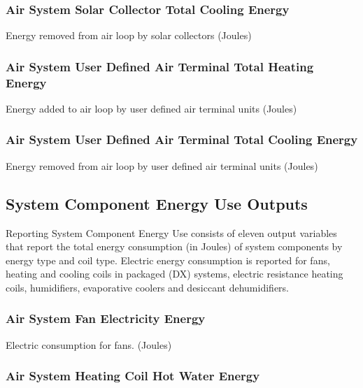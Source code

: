 \subsubsection{Air System Solar Collector Total Cooling Energy}\label{air-system-solar-collector-total-cooling-energy}

Energy removed from air loop by solar collectors (Joules)

\subsubsection{Air System User Defined Air Terminal Total Heating Energy}\label{air-system-user-defined-air-terminal-total-heating-energy}

Energy added to air loop by user defined air terminal units (Joules)

\subsubsection{Air System User Defined Air Terminal Total Cooling Energy}\label{air-system-user-defined-air-terminal-total-cooling-energy}

Energy removed from air loop by user defined air terminal units (Joules)

\subsection{System Component Energy Use Outputs}\label{system-component-energy-use-outputs}

Reporting System Component Energy Use consists of eleven output variables that report the total energy consumption (in Joules) of system components by energy type and coil type. Electric energy consumption is reported for fans, heating and cooling coils in packaged (DX) systems, electric resistance heating coils, humidifiers, evaporative coolers and desiccant dehumidifiers.

\subsubsection{Air System Fan Electricity Energy}\label{air-system-fan-electric-energy}

Electric consumption for fans. (Joules)

\subsubsection{Air System Heating Coil Hot Water Energy}\label{air-system-heating-coil-hot-water-energy}

